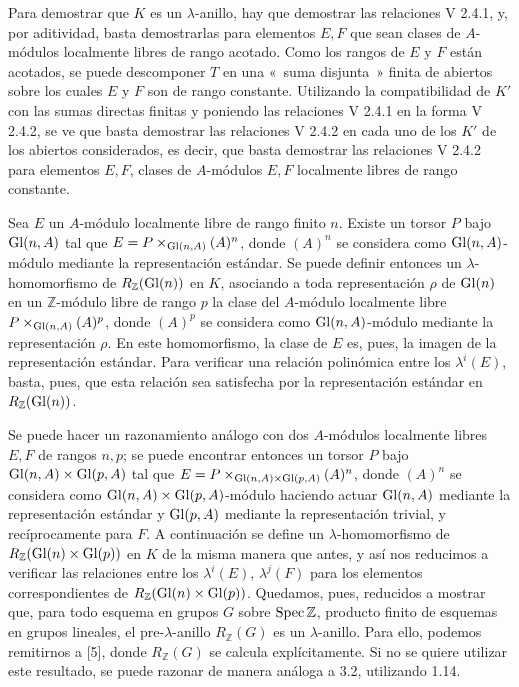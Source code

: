 Para demostrar que \(K\) es un \(\lambda\)-anillo, hay que demostrar las relaciones V 2.4.1, y, por aditividad, basta demostrarlas para elementos \(E,F\) que sean clases de \(A\)-módulos localmente libres de rango acotado. Como los rangos de \(E\) y \(F\) están acotados, se puede descomponer \(T\) en una «~suma disjunta~» finita de abiertos sobre los cuales \(E\) y \(F\) son de rango constante. Utilizando la compatibilidad de \(K'\) con las sumas directas finitas y poniendo las relaciones V 2.4.1 en la forma V 2.4.2, se ve que basta demostrar las relaciones V 2.4.2 en cada uno de los \(K'\) de los abiertos considerados, es decir, que basta demostrar las relaciones V 2.4.2 para elementos \(E,F\), clases de \(A\)-módulos \(E,F\) localmente libres de rango constante.

Sea \(E\) un \(A\)-módulo localmente libre de rango finito \(n\). Existe un torsor \(P\) bajo \(\operatorname{Gl}(n,A)\) tal que \(E=P\times_{\operatorname{Gl}(n,A)} (A)^n\), donde \((A)^n\) se considera como \(\operatorname{Gl}(n,A)\)-módulo mediante la representación estándar. Se puede definir entonces un \(\lambda\)-homomorfismo de \(R_{\mathbb Z}(\operatorname{Gl}(n))\) en \(K\), asociando a toda representación \(\rho\) de \(\operatorname{Gl}(n)\) en un \(\mathbb Z\)-módulo libre de rango \(p\) la clase del \(A\)-módulo localmente libre
\(P\times_{\operatorname{Gl}(n,A)} (A)^p\), donde \((A)^p\) se considera como \(\operatorname{Gl}(n,A)\)-módulo mediante la representación \(\rho\). En este homomorfismo, la clase de \(E\) es, pues, la imagen de la representación estándar. Para verificar una relación polinómica entre los \(\lambda^i(E)\), basta, pues, que esta relación sea satisfecha por la representación estándar en \(R_{\mathbb Z}(\operatorname{Gl}(n))\).

Se puede hacer un razonamiento análogo con dos \(A\)-módulos localmente libres \(E,F\) de rangos \(n,p\); se puede encontrar entonces un torsor \(P\) bajo \(\operatorname{Gl}(n,A)\times\operatorname{Gl}(p,A)\) tal que \(E=P\times_{\operatorname{Gl}(n,A)\times\operatorname{Gl}(p,A)} (A)^n\), donde \((A)^n\) se considera como \(\operatorname{Gl}(n,A)\times\operatorname{Gl}(p,A)\)-módulo haciendo actuar \(\operatorname{Gl}(n,A)\) mediante la representación estándar y \(\operatorname{Gl}(p,A)\) mediante la representación trivial, y recíprocamente para \(F\). A continuación se define un \(\lambda\)-homomorfismo de \(R_{\mathbb Z}(\operatorname{Gl}(n)\times\operatorname{Gl}(p))\) en \(K\) de la misma manera que antes, y así nos reducimos a verificar las relaciones entre los \(\lambda^i(E)\), \(\lambda^j(F)\) para los elementos correspondientes de \(R_{\mathbb Z}(\operatorname{Gl}(n)\times\operatorname{Gl}(p))\). Quedamos, pues, reducidos a mostrar que, para todo esquema en grupos \(G\) sobre \(\operatorname{Spec}\mathbb Z\), producto finito de esquemas en grupos lineales, el pre-\(\lambda\)-anillo \(R_{\mathbb Z}(G)\) es un \(\lambda\)-anillo. Para ello, podemos remitirnos a [5], donde \(R_{\mathbb Z}(G)\) se calcula explícitamente. Si no se quiere utilizar este resultado, se puede razonar de manera análoga a 3.2, utilizando 1.14.
